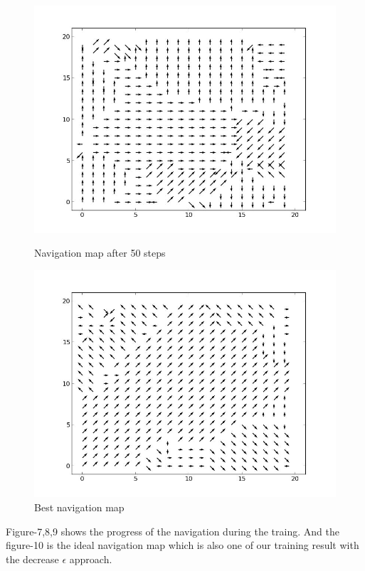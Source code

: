 \documentclass[a4paper, 11pt]{article}
\begin{document}
\begin{figure}
\begin{minipage}[c]{0.5\textwidth}
    \includegraphics[scale=0.3]{../figure/navMp50.jpeg}
  \caption{Navigation map after 50 steps}
  \end{minipage}%
  \begin{minipage}[c]{0.5\textwidth}
    \centering
    \includegraphics[scale=0.3]{../figure/navMap.jpeg}
  \caption{Best navigation map}
  \end{minipage}
\end{figure}

Figure-7,8,9 shows the progress of the navigation during the traing. And the figure-10 is the ideal navigation map which is also one of our training result with the decrease $\epsilon$ approach.
\end{document}
